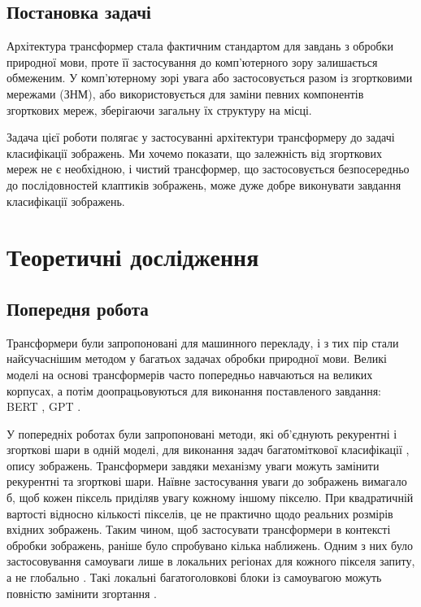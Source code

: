 \documentclass[a4paper,14pt]{extreport}
\begin{document}
\subsection{Постановка задачі}
Архітектура трансформер стала фактичним стандартом
для завдань з обробки природної мови, проте її застосування
до комп'ютерного зору залишається обмеженим. У комп'ютерному
зорі увага або застосовується разом із згортковими мережами (ЗНМ),
або використовується для заміни певних компонентів
згорткових мереж, зберігаючи загальну їх структуру на місці.

Задача цієї роботи полягає у застосуванні архітектури
трансформеру до задачі класифікації зображень. Ми хочемо показати,
що залежність від згорткових мереж не є необхідною, і чистий
трансформер, що застосовується безпосередньо до послідовностей
клаптиків зображень, може дуже добре виконувати
завдання класифікації зображень.

\section{Теоретичні дослідження}
\subsection{Попередня робота}
Трансформери були запропоновані \cite{attention-all-need}
для машинного перекладу, і з тих пір стали
найсучаснішим методом у багатьох задачах обробки природної
мови. Великі моделі на основі трансформерів
часто попередньо навчаються на великих корпусах, а потім
доопрацьовуються для виконання поставленого завдання:
BERT \cite{bert}, GPT \cite{gpt}.

У попередніх роботах були запропоновані методи, які об'єднують
рекурентні і згорткові шари в одній моделі, для виконання задач
багатоміткової класифікації \cite{nn:cnn-rnn}, опису зображень.
Трансформери завдяки механізму уваги можуть
замінити рекурентні та згорткові шари. Наївне застосування
уваги до зображень вимагало б, щоб кожен піксель приділяв
увагу кожному іншому пікселю. При квадратичній вартості відносно кількості
пікселів, це не практично щодо реальних розмірів
вхідних зображень. Таким чином, щоб застосувати
трансформери в контексті обробки зображень,
раніше було спробувано кілька наближень. Одним з них
було застосовування самоуваги лише в локальних
регіонах для кожного пікселя запиту, а не глобально \cite{image-trans}.
Такі локальні багатоголовкові блоки із самоувагою
можуть повністю замінити згортання \cite{local-regions-attention}.
\end{document}
